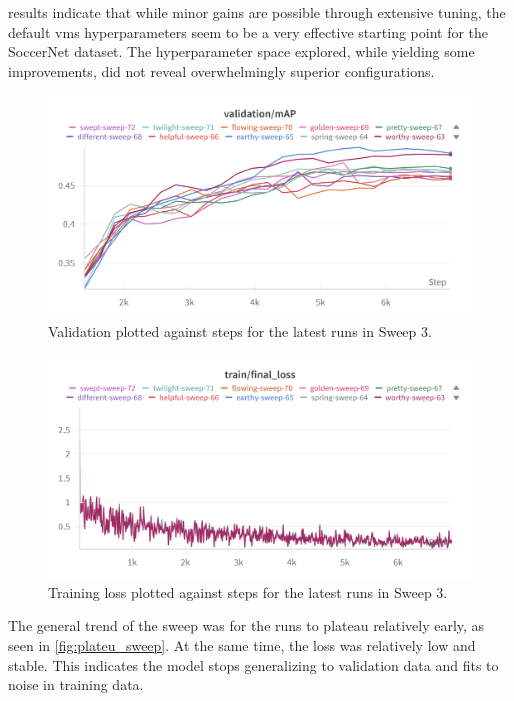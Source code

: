 results indicate that while minor gains are possible through extensive tuning, the default \acrshort{vms} hyperparameters seem to be a very effective starting point for the SoccerNet dataset. The hyperparameter space explored, while yielding some improvements, did not reveal overwhelmingly superior configurations.


\begin{figure}
    \centering
    \includegraphics[width=0.75\linewidth]{figures/plateu_sweep.png}
    \caption{Validation plotted against steps for the latest runs in Sweep 3. }
    \label{fig:plateu_sweep}
\end{figure}
\begin{figure}
    \centering
    \includegraphics[width=0.75\linewidth]{figures/plateu_loss.png}
    \caption{Training loss plotted against steps for the latest runs in Sweep 3.}
    \label{fig:plateu_loss}
\end{figure}
The general trend of the sweep was for the runs to plateau relatively early, as seen in \autoref{fig:plateu_sweep}. At the same time, the loss was relatively low and stable. This indicates the model stops generalizing to validation data and fits to noise in training data.


